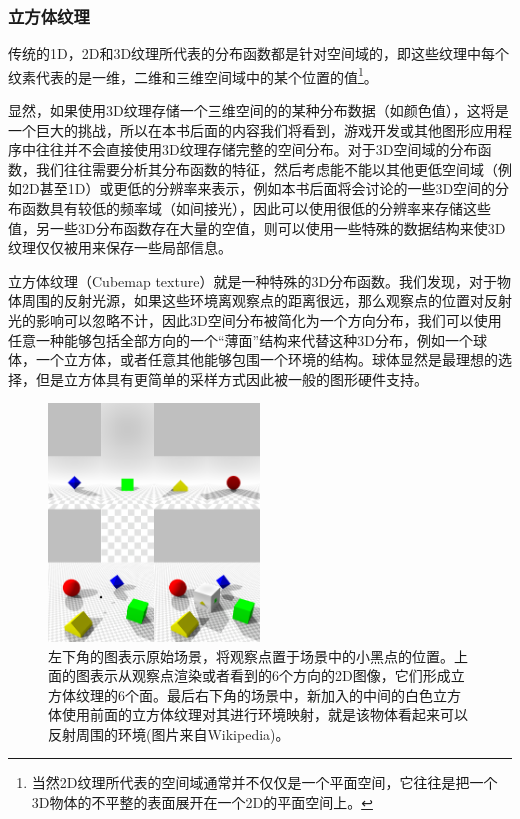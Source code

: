 \subsubsection{立方体纹理}
传统的1D，2D和3D纹理所代表的分布函数都是针对空间域的，即这些纹理中每个纹素代表的是一维，二维和三维空间域中的某个位置的值\footnote{当然2D纹理所代表的空间域通常并不仅仅是一个平面空间，它往往是把一个3D物体的不平整的表面展开在一个2D的平面空间上。}。

显然，如果使用3D纹理存储一个三维空间的的某种分布数据（如颜色值），这将是一个巨大的挑战，所以在本书后面的内容我们将看到，游戏开发或其他图形应用程序中往往并不会直接使用3D纹理存储完整的空间分布。对于3D空间域的分布函数，我们往往需要分析其分布函数的特征，然后考虑能不能以其他更低空间域（例如2D甚至1D）或更低的分辨率来表示，例如本书后面将会讨论的一些3D空间的分布函数具有较低的频率域（如间接光），因此可以使用很低的分辨率来存储这些值，另一些3D分布函数存在大量的空值，则可以使用一些特殊的数据结构来使3D纹理仅仅被用来保存一些局部信息。

立方体纹理（Cubemap texture）就是一种特殊的3D分布函数。我们发现，对于物体周围的反射光源，如果这些环境离观察点的距离很远，那么观察点的位置对反射光的影响可以忽略不计，因此3D空间分布被简化为一个方向分布，我们可以使用任意一种能够包括全部方向的一个“薄面”结构来代替这种3D分布，例如一个球体，一个立方体，或者任意其他能够包围一个环境的结构。球体显然是最理想的选择，但是立方体具有更简单的采样方式因此被一般的图形硬件支持。

\begin{figure}
\sidecaption
	\includegraphics[width=0.5\textwidth]{figures/api/cube-map}
	\caption{左下角的图表示原始场景，将观察点置于场景中的小黑点的位置。上面的图表示从观察点渲染或者看到的6个方向的2D图像，它们形成立方体纹理的6个面。最后右下角的场景中，新加入的中间的白色立方体使用前面的立方体纹理对其进行环境映射，就是该物体看起来可以反射周围的环境(图片来自Wikipedia)。}
	\label{f:api-cube-map}
\end{figure}

